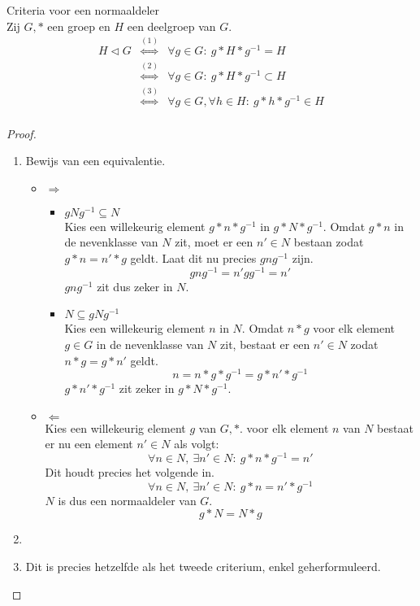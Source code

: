 \documentclass[main.tex]{subfiles}
\begin{document}
\begin{st}
  \label{st:criteria-voor-normaaldeler}
  Criteria voor een normaaldeler\\
  Zij $G,*$ een groep en $H$ een deelgroep van $G$.
  \[
  \begin{array}{rcl}
    H \triangleleft G &\overset{(1)}{\Leftrightarrow} & \forall g \in G:\ g*H*g^{-1} = H\\
                      &\overset{(2)}{\Leftrightarrow} & \forall g \in G:\ g*H*g^{-1} \subset H\\
                      &\overset{(3)}{\Leftrightarrow} & \forall g \in G,\forall h \in H:\ g*h*g^{-1} \in H\\
  \end{array}
  \]

  \begin{proof}
    \begin{enumerate}
    \item Bewijs van een equivalentie.
      \begin{itemize}
      \item $\Rightarrow$\\
        \begin{itemize}
        \item $gNg^{-1}\subseteq N$\\
          Kies een willekeurig element $g*n*g^{-1}$ in $g*N*g^{-1}$.
          Omdat $g*n$ in de nevenklasse van $N$ zit, moet er een $n'\in N$ bestaan zodat $g*n =n'*g$ geldt.
          Laat dit nu precies $gng^{-1}$ zijn.
          \[ gng^{-1} = n'gg^{-1} = n' \]
          $gng^{-1}$ zit dus zeker in $N$.\\
        \item $N \subseteq gNg^{-1}$\\
          Kies een willekeurig element $n$ in $N$.
          Omdat $n*g$ voor elk element $g\in G$ in de nevenklasse van $N$ zit, bestaat er een $n'\in N$ zodat $n*g = g*n'$ geldt.
          \[ n = n * g * g^{-1} = g*n'*g^{-1}\]
          $g*n'*g^{-1}$ zit zeker in $g*N*g^{-1}$.
        \end{itemize}
      \item $\Leftarrow$\\
        Kies een willekeurig element $g$ van $G,*$. voor elk element $n$ van $N$ bestaat er nu een element $n'\in N$ als volgt:
        \[ \forall n\in N,\ \exists n'\in N:\ g*n*g^{-1} =n' \]
        Dit houdt precies het volgende in.
        \[ \forall n\in N,\ \exists n'\in N:\ g*n=n'*g^{-1} \]
        $N$ is dus een normaaldeler van $G$.
        \[ g*N = N*g \]
      \end{itemize}

    \item {}
    \item Dit is precies hetzelfde als het tweede criterium, enkel geherformuleerd.
    \end{enumerate}
  \end{proof}
\end{st}
\end{document}
